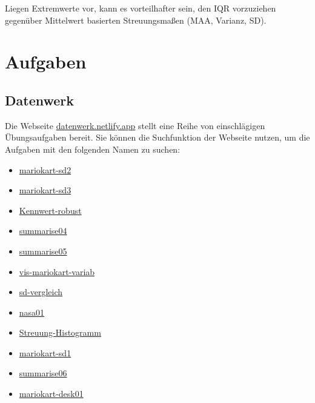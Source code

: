 \documentclass[
  letterpaper,
]{scrbook}
\providecommand{\tightlist}{%
  \setlength{\itemsep}{0pt}\setlength{\parskip}{0pt}}\usepackage{longtable,booktabs,array}
\theoremstyle{definition}
\theoremstyle{definition}
\theoremstyle{definition}
\theoremstyle{remark}
\begin{document}
Liegen Extremwerte vor, kann es vorteilhafter sein, den IQR vorzuziehen
gegenüber Mittelwert basierten Streuungsmaßen (MAA, Varianz, SD).

\section{Aufgaben}\label{aufgaben-5}

\subsection{Datenwerk}\label{datenwerk}

Die Webseite \href{https://datenwerk.netlify.app}{datenwerk.netlify.app}
stellt eine Reihe von einschlägigen Übungsaufgaben bereit. Sie können
die Suchfunktion der Webseite nutzen, um die Aufgaben mit den folgenden
Namen zu suchen:

\begin{itemize}
\tightlist
\item
  \href{https://sebastiansauer.github.io/Datenwerk/posts/mariokart-sd2/mariokart-sd2}{mariokart-sd2}
\item
  \href{https://sebastiansauer.github.io/Datenwerk/posts/mariokart-sd3/mariokart-sd3}{mariokart-sd3}
\item
  \href{https://sebastiansauer.github.io/Datenwerk/posts/kennwert-robust/kennwert-robust}{Kennwert-robust}
\item
  \href{https://sebastiansauer.github.io/Datenwerk/posts/summarise04/summarise04}{summarise04}
\item
  \href{https://sebastiansauer.github.io/Datenwerk/posts/summarise05/summarise05}{summarise05}
\item
  \href{https://sebastiansauer.github.io/Datenwerk/posts/vis-mariokart-variab/vis-mariokart-variab}{vis-mariokart-variab}
\item
  \href{https://sebastiansauer.github.io/Datenwerk/posts/sd-vergleich/sd-vergleich}{sd-vergleich}
\item
  \href{https://sebastiansauer.github.io/Datenwerk/posts/nasa01/nasa01}{nasa01}
\item
  \href{https://sebastiansauer.github.io/Datenwerk/posts/streuung-histogramm/streuung-histogramm}{Streuung-Histogramm}
\item
  \href{https://sebastiansauer.github.io/Datenwerk/posts/mariokart-sd1/mariokart-sd1}{mariokart-sd1}
\item
  \href{https://sebastiansauer.github.io/Datenwerk/posts/summarise06/summarise06}{summarise06}
\item
  \href{https://sebastiansauer.github.io/Datenwerk/posts/mariokart-desk01/mariokart-desk01}{mariokart-desk01}
\end{itemize}
\end{document}
